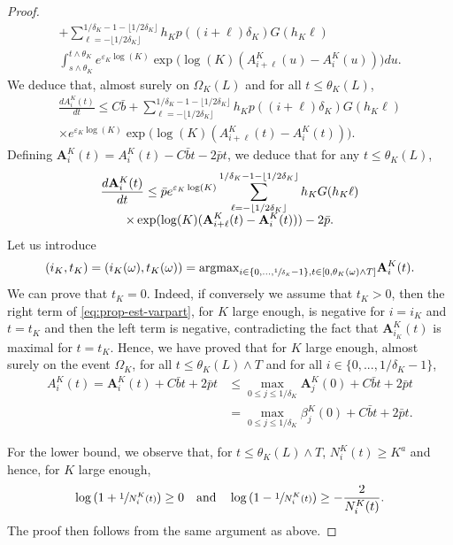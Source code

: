 \documentclass[10pt]{amsart}
\theoremstyle{plain}
\theoremstyle{remark}
\begin{document}
\begin{proof}
\begin{multline*}
+ \sum_{\ell=-\lfloor 1/2\delta_K\rfloor}^{1/\delta_K-1-\lfloor 1/2\delta_K\rfloor} h_{K} p((i+\ell) \delta_{K}) G(h_{K}\ell) \\[-2pt] \int_{s\wedge \theta_K }^{t\wedge \theta_K} e^{\varepsilon_K \log(K) } \exp\bigl(\log(K) (A^K_{i+\ell}(u)-A^K_{i}(u))\bigr) du.
\end{multline*}
We deduce that, almost surely on $\Omega_K(L)$ and for all $t\leq\theta_K(L)$,\vspace*{-5pt}
\begin{multline*}
\frac{dA^K_{i}(t)}{dt} \leq C\bar b
+ \sum_{\ell=-\lfloor 1/2\delta_K\rfloor}^{1/\delta_K-1-\lfloor 1/2\delta_K\rfloor} h_{K} p((i+\ell) \delta_{K}) G(h_{K}\ell) \\[-8pt] \times e^{\varepsilon_K\log(K) } \exp\bigl(\log(K) (A^K_{i+\ell}(t)-A^K_{i}(t))\bigr).
\end{multline*}
Defining $\mathbf{A}^K_i(t) = A^K_{i}(t) - C\bar bt - 2 \bar p t$, we deduce that for any $t\leq \theta_K(L)$,\vspace*{-5pt}
\begin{multline}
\label{eq:prop-est-varpart}
{d \mathbf{A}^K_{i}(t)\over dt}\leq \bar p e^{\varepsilon_K\log(K) } \sum_{\ell=-\lfloor 1/2\delta_K\rfloor}^{1/\delta_K-1-\lfloor 1/2\delta_K\rfloor} h_{K} G(h_{K}\ell) \\[-5pt]
\times \exp(\log(K) (\mathbf{A}^K_{i+\ell}(t)- \mathbf{A}^K_{i}(t))) - 2 \bar p.
\end{multline}
Let us introduce
\[(i_{K}, t_{K}) = (i_K(\omega),t_K(\omega))=\text{argmax}_{{i\in \{0,\dots, \sfrac{1}{\delta_{K}}-1\}, t\in [0, \theta_{K}(\omega)\wedge T]}} \mathbf{A}^K_{i}(t).\]
We can prove that $t_{K}=0.$
Indeed, if conversely we assume that $t_{K}>0$, then the right term of \eqref{eq:prop-est-varpart}, for $K$ large enough, is negative for $i=i_{K}$ {and $t=t_K$} and then the
left term is negative, contradicting the fact that $\mathbf{A}^K_{i_K}(t)$ is maximal for $t=t_K$. Hence, we have proved that {for $K$ large enough}, almost surely on
the event $\Omega_K$, for all $t\leq \theta_K(L)\wedge T$ and for all $i \in \{0, . . . , 1/\delta_K - 1 \}$,
\begin{align*}
A^K_i(t)=\mathbf{A}^K_i(t)+C\bar bt + 2 \bar p t&\leq\max_{0\leq j\leq 1/\delta_K}\mathbf{A}^K _j(0)+C\bar b t + 2 \bar p t\\
&= \max_{0\leq j\leq 1/\delta_K} \beta^K _j(0)+C\bar b t + 2 \bar p t.
\end{align*}

For the lower bound, we observe that, for $t\leq \theta_K(L)\wedge T$, $N^K_i(t)\geq K^a$ and hence, for $K$ large enough,
\[
\log\left(1+\sfrac{1}{N^K_i(t)}\right)\geq 0 \quad\text{and}\quad \log\left(1-\sfrac{1}{N^K_i(t)}\right)\geq -\frac{2}{N^K_i(t)}.
\]
The proof then follows from the same argument as above.
\end{proof}
\end{document}
